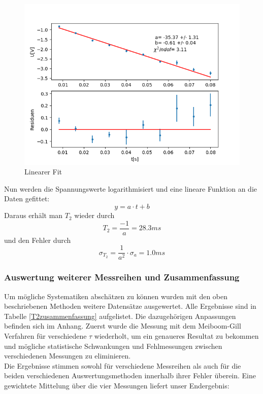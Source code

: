 \documentclass[12pt,a4paper]{article}
\begin{document}
\begin{figure}
\centering
\includegraphics[scale=0.9]{Bilder/T2lin.png}
\caption{Linearer Fit}
\label{fig:T2lin}
\end{figure}

Nun werden die Spannungswerte logarithmisiert und eine lineare Funktion an die Daten gefittet:
\begin{equation}
y = a \cdot t + b
\end{equation}
Daraus erhält man $T_2$ wieder durch 
\begin{equation*}
T_2 = \dfrac{-1}{a} = 28.3ms
\end{equation*}
und den Fehler durch
\begin{equation*}
\sigma_{T_2} = \dfrac{1}{a^2} \cdot \sigma_a = 1.0ms
\end{equation*}

\subsubsection{Auswertung weiterer Messreihen und Zusammenfassung}

Um mögliche Systematiken abschätzen zu können wurden mit den oben beschriebenen Methoden weitere Datensätze ausgewertet. Alle Ergebnisse sind in Tabelle \ref{T2zusammenfassung} aufgelistet. Die dazugehörigen Anpassungen befinden sich im Anhang.
Zuerst wurde die Messung mit dem Meiboom-Gill Verfahren für verschiedene $\tau$ wiederholt, um ein genaueres Resultat zu bekommen und mögliche statistische Schwankungen und Fehlmessungen zwischen verschiedenen Messungen zu eliminieren.\\
Die Ergebnisse stimmen sowohl für verschiedene Messreihen als auch für die beiden verschiedenen Auswertungsmethoden innerhalb ihrer Fehler überein. 	Eine gewichtete Mittelung über die vier Messungen liefert unser Endergebnis:
\end{document}
